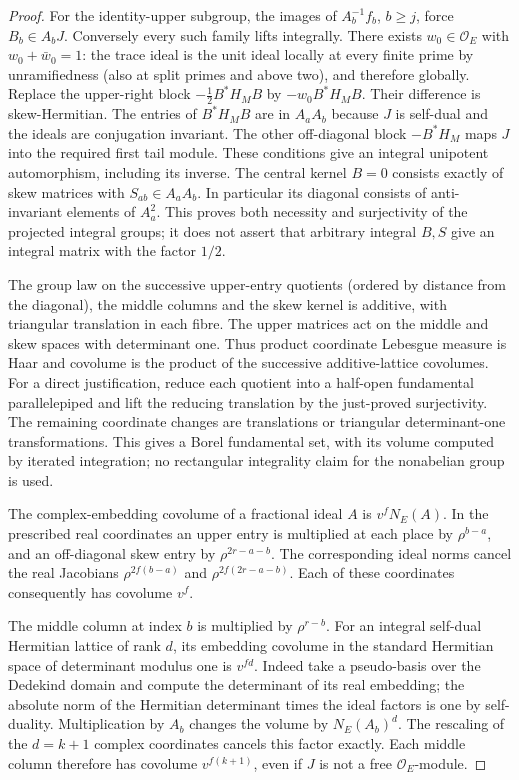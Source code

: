\begin{proof}
For the identity-upper subgroup, the images of
\(A_b^{-1}f_b\), \(b\ge j\), force \(B_b\in A_b J\).
Conversely every such family lifts integrally.
There exists \(w_0\in\mathcal O_E\) with
\(w_0+\bar w_0=1\): the trace ideal is the unit ideal locally
at every finite prime by unramifiedness (also at split primes
and above two), and therefore globally. Replace the upper-right
block \(-\tfrac12 B^*H_MB\) by \(-w_0 B^*H_MB\). Their difference
is skew-Hermitian. The entries of \(B^*H_MB\) are in
\(A_a A_b\) because \(J\) is self-dual and the ideals are
conjugation invariant. The other off-diagonal block
\(-B^*H_M\) maps \(J\) into the required first tail module.
These conditions give an integral unipotent automorphism,
including its inverse. The central kernel \(B=0\) consists exactly
of skew matrices with \(S_{ab}\in A_a A_b\). In particular its
diagonal consists of anti-invariant elements of \(A_a^2\).
This proves both necessity and surjectivity of the projected
integral groups; it does not assert that arbitrary integral
\(B,S\) give an integral matrix with the factor \(1/2\).

The group law on the successive upper-entry quotients (ordered
by distance from the diagonal), the middle columns and the
skew kernel is additive, with triangular translation in each
fibre. The upper matrices act on the middle and skew spaces
with determinant one. Thus product coordinate Lebesgue
measure is Haar and covolume is the product of the successive
additive-lattice covolumes. For a direct justification, reduce
each quotient into a half-open fundamental parallelepiped
and lift the reducing translation by the just-proved
surjectivity. The remaining coordinate changes are
translations or triangular determinant-one transformations.
This gives a Borel fundamental set, with its volume computed
by iterated integration; no rectangular integrality claim
for the nonabelian group is used.

The complex-embedding covolume of a fractional ideal \(A\) is
\(v^f N_E(A)\). In the prescribed real coordinates an upper
entry is multiplied at each place by \(\rho^{b-a}\), and
an off-diagonal skew entry by \(\rho^{2r-a-b}\).
The corresponding ideal norms cancel the real Jacobians
\(\rho^{2f(b-a)}\) and \(\rho^{2f(2r-a-b)}\).
Each of these coordinates consequently has covolume \(v^f\).

The middle column at index \(b\) is multiplied by
\(\rho^{r-b}\). For an integral self-dual Hermitian lattice of
rank \(d\), its embedding covolume in the standard Hermitian
space of determinant modulus one is \(v^{fd}\).
Indeed take a pseudo-basis over the Dedekind domain and compute
the determinant of its real embedding; the absolute norm of
the Hermitian determinant times the ideal factors is one by
self-duality. Multiplication by \(A_b\) changes the volume by
\(N_E(A_b)^d\). The rescaling of the \(d=k+1\) complex
coordinates cancels this factor exactly. Each middle column
therefore has covolume \(v^{f(k+1)}\), even if \(J\) is not a
free \(\mathcal O_E\)-module.


\end{proof}
